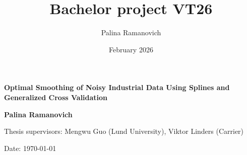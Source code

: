 \documentclass[11pt,leqno]{book}
\title{Bachelor project VT26}
\author{Palina Ramanovich}
\date{February 2026}
\theoremstyle{definition}
\theoremstyle{plain}
\theoremstyle{definition}
\begin{document}
\begin{titlepage}
   \begin{center}
       \vspace*{1cm}

       \textbf{\Large{Optimal Smoothing of Noisy Industrial Data Using Splines and Generalized Cross Validation}}

       \vspace{0.5cm}
            


       \textbf{\large{Palina Ramanovich}}

       \vfill
       \large{Thesis supervisors: Mengwu Guo (Lund University), Viktor Linders (Carrier)}
       
            
       \vspace{0.8cm}
     
       
            
       Date: \today
   \end{center}
\end{titlepage}
\let\cleardoublepage\clearpage
\end{document}
